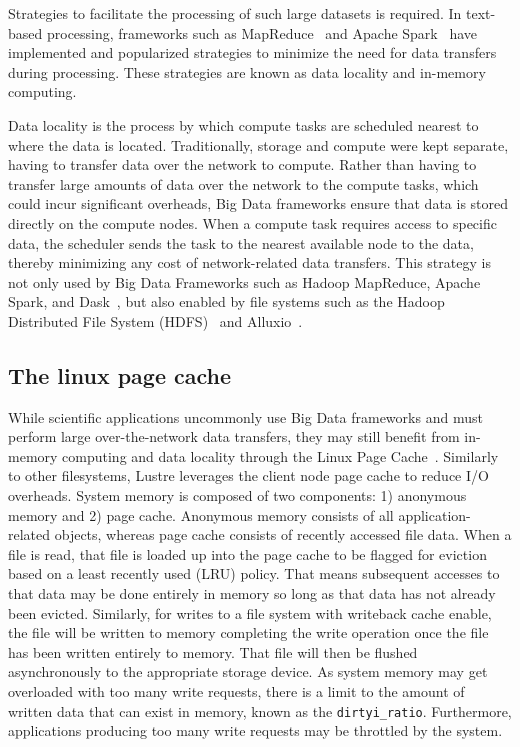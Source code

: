 \documentclass[10pt,journal,compsoc]{IEEEtran}
\begin{document}
      Strategies to facilitate the processing of such large datasets is required. In text-based
      processing, frameworks such as MapReduce~\cite{mapreduce} and Apache Spark~\cite{spark}
      have implemented and popularized strategies to minimize the need for data transfers during processing.
      These strategies are known as data locality and in-memory computing.

      Data locality is the process by which compute tasks are scheduled nearest to where
      the data is located. Traditionally, storage and compute were kept separate,
      having to transfer data over the network to compute. Rather than having to transfer large amounts of data over the
      network to the compute tasks, which could incur significant overheads, Big Data frameworks ensure that data is
      stored directly on the compute nodes. When a compute task requires access to specific
      data, the scheduler sends the task to the nearest available node to the data, thereby
      minimizing any cost of network-related data transfers. This strategy is not only
      used by Big Data Frameworks such as Hadoop MapReduce, Apache Spark, and Dask~\cite{dask},
      but also enabled by file systems such as the Hadoop Distributed File System (HDFS)~\cite{hdfs}
      and Alluxio~\cite{alluxio}.



\subsection{The linux page cache}
 While scientific applications uncommonly use Big Data frameworks and must perform
      large over-the-network data transfers, they may still benefit from in-memory
      computing and data locality through the Linux Page Cache~\cite{pagecache}. Similarly to other
      filesystems, Lustre leverages the client node page cache to reduce I/O overheads.
      System memory is composed of two components: 1) anonymous memory and 2) page cache.
      Anonymous memory consists of all application-related objects, whereas page cache
      consists of recently accessed file data. When a file is read, that file is loaded
      up into the page cache to be flagged for eviction based on a least recently used (LRU)
      policy. That means subsequent accesses to that data may be done entirely
      in memory so long as that data has not already been evicted. Similarly, for writes
      to a file system with writeback cache enable, the file will be written to memory
      completing the write operation once the file has been written entirely to memory.
      That file will then be flushed asynchronously to the appropriate storage device.
      As system memory may get overloaded with too many write requests, there is a limit to the amount of written data that
      can exist in memory, known as the \texttt{dirtyi\_ratio}. Furthermore, applications
      producing too many write requests may be throttled by the system.
\end{document}
